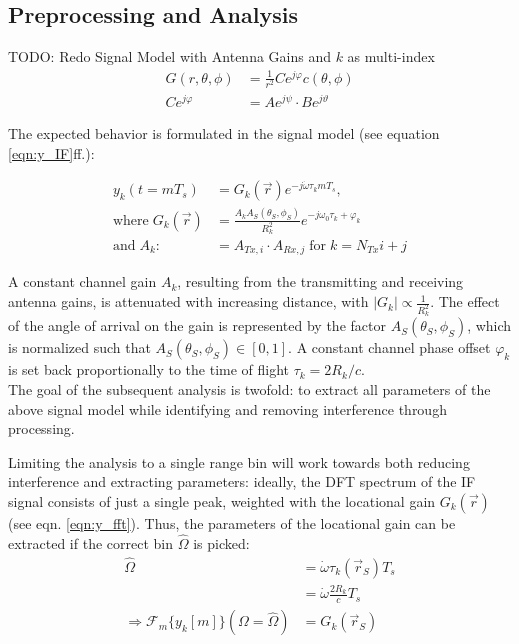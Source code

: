 \subsection{Preprocessing and Analysis}

TODO: Redo Signal Model with Antenna Gains and $k$ as multi-index
\begin{align*}
    G(r,\theta,\phi) & = \frac{1}{r^2}Ce^{j\varphi} c(\theta,\phi) \\
    Ce^{j\varphi}    & =Ae^{j\psi}\cdot Be^{j\vartheta}
\end{align*}

The expected behavior is formulated in the signal model (see equation \ref{eqn:y_IF}ff.):

\begin{align}
    y_k(t=mT_s)                & =                  G_k(\vec r) e^{-j\dot\omega\tau_k mT_s},                 \\
    \text{where}\; G_k(\vec r) & = \frac{A_kA_S(\theta_S,\phi_S)}{R_{k}^2}  e^{-j\omega_0\tau_k + \varphi_k} \\
    \text{and}\;A_k :          & = A_{Tx,i} \cdot A_{Rx,j} \;\text{for}\;k=N_{Tx}i+j
\end{align}

A constant channel gain $A_k$, resulting from the transmitting and receiving antenna gains,
is attenuated with increasing distance, with $|G_k| \propto \frac{1}{R_{k}^2}$.
The effect of the angle of arrival on the gain is represented by the factor $A_S(\theta_S,\phi_S)$,
which is normalized such that $A_S(\theta_S,\phi_S) \in [0,1]$.
A constant channel phase offset $\varphi_k$ is set back proportionally to the time of flight $\tau_k = 2R_k/c$. \\

The goal of the subsequent analysis is twofold:
to extract all parameters of the above signal model while identifying and removing interference through processing.

Limiting the analysis to a single range bin will work towards both reducing interference and extracting parameters:
ideally, the DFT spectrum of the IF signal consists of just a single peak,
weighted with the locational gain $G_k(\vec r)$ (see eqn. \ref{eqn:y_fft}).
Thus, the parameters of the locational gain can be extracted if the correct bin $\hat \Omega$ is picked:
\begin{align}
    \hat \Omega                                               & = \dot \omega \tau_k(\vec r_S)T_s    \\
                                                              & = \dot \omega \frac{2R_k}{c}T_s      \\
    \Rightarrow \mathcal{F}_m\{y_k[m]\}(\Omega = \hat \Omega) & =    G_k(\vec r_S) \label{eqn:G_fft}
\end{align}


